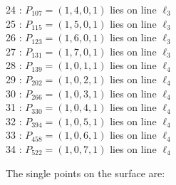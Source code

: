 \documentclass{article}
\begin{document}
{\begin{multicols}{2}
24 : $P_{107}=( 1, 4, 0, 1 )$ lies on line $\ell_{3}$\\
25 : $P_{115}=( 1, 5, 0, 1 )$ lies on line $\ell_{3}$\\
26 : $P_{123}=( 1, 6, 0, 1 )$ lies on line $\ell_{3}$\\
27 : $P_{131}=( 1, 7, 0, 1 )$ lies on line $\ell_{3}$\\
28 : $P_{139}=( 1, 0, 1, 1 )$ lies on line $\ell_{4}$\\
29 : $P_{202}=( 1, 0, 2, 1 )$ lies on line $\ell_{4}$\\
30 : $P_{266}=( 1, 0, 3, 1 )$ lies on line $\ell_{4}$\\
31 : $P_{330}=( 1, 0, 4, 1 )$ lies on line $\ell_{4}$\\
32 : $P_{394}=( 1, 0, 5, 1 )$ lies on line $\ell_{4}$\\
33 : $P_{458}=( 1, 0, 6, 1 )$ lies on line $\ell_{4}$\\
34 : $P_{522}=( 1, 0, 7, 1 )$ lies on line $\ell_{4}$\\
\end{multicols}
The single points on the surface are:\\
}
\end{document}
